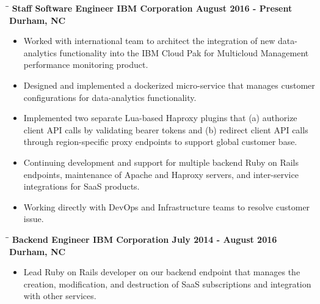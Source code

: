 \documentclass[8pt]{res}
\begin{document}
\begin{resume}
    \begin{tabbing}
      \hspace{2.3in}\= \hspace{2.6in}\= \kill %
      \bf Staff Software Engineer \>\bf IBM Corporation \>\bf August 2016 - Present\\ \>\bf Durham, NC
    \end{tabbing}\vspace{-10pt}      %
    \begin{itemize}
      \item Worked with international team to architect the integration of new data-analytics functionality into the IBM Cloud Pak for Multicloud Management performance monitoring product.
      \item Designed and implemented a dockerized micro-service that manages customer configurations for data-analytics functionality.
      \item Implemented two separate Lua-based Haproxy plugins that (a) authorize client API calls by validating bearer tokens and (b) redirect client API calls through region-specific proxy endpoints to support global customer base.
      \item Continuing development and support for multiple backend Ruby on Rails endpoints, maintenance of Apache and Haproxy servers, and inter-service integrations for SaaS products.
      \item Working directly with DevOps and Infrastructure teams to resolve customer issue.
    \end{itemize}\vspace{-18pt}      %
    \begin{tabbing}
      \hspace{2.3in}\= \hspace{2.6in}\= \kill %
      \bf Backend Engineer \>\bf IBM Corporation \>\bf July 2014 - August 2016\\ \>\bf Durham, NC
    \end{tabbing}\vspace{-10pt}      %
    \begin{itemize}
      \item Lead Ruby on Rails developer on our backend endpoint that manages the creation, modification, and destruction of SaaS subscriptions and integration with other services.

\end{itemize}
\end{resume}
\end{document}

